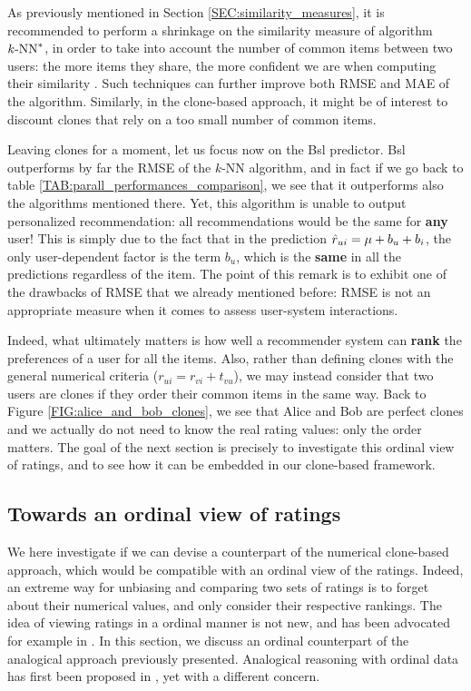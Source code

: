 As previously mentioned in Section \ref{SEC:similarity_measures}, it is recommended to perform a
shrinkage on the similarity measure of algorithm $k\text{-NN}^*$, in order to take into
account the number of common items between two users: the more items they
share, the more confident we are when computing their similarity
\cite{KorACM2010}. Such techniques can further improve both RMSE and MAE of the
algorithm.  Similarly, in the clone-based approach, it might be of interest to
discount clones that rely on a too small number of common items.

Leaving clones for a moment, let us focus now on the Bsl predictor. Bsl outperforms by far the RMSE of the
$k$-NN algorithm, and in fact if we go back to table
\ref{TAB:parall_performances_comparison}, we see that it outperforms also the
algorithms mentioned there. Yet, this algorithm is unable to output
personalized recommendation: all recommendations would be the same for
\textbf{any} user! This is simply due to the fact that in the prediction
$\hat{r}_{ui} = \mu  + b_u + b_i$, the only user-dependent factor is the term
$b_u$, which is the \textbf{same} in all the predictions regardless of the
item. The point of this remark is to exhibit one of the drawbacks of RMSE that
we already mentioned before: RMSE is not an appropriate measure when it comes
to assess user-system interactions.

Indeed, what ultimately matters is how well a recommender system can
\textbf{rank} the preferences of a user for all the items. Also, rather than
defining clones with the general numerical criteria ($r_{ui} = r_{vi} +
t_{vu}$), we may instead consider that two users are clones if they order their
common items in the same way. Back to Figure \ref{FIG:alice_and_bob_clones}, we
see that Alice and Bob are perfect clones and we actually do not need to know
the real rating values: only the order matters. The goal of the next section is
precisely to investigate this ordinal view of ratings, and to see how it can be
embedded in our clone-based framework.

\subsection{Towards an ordinal view of ratings}

We here investigate if we can devise a counterpart of the numerical clone-based
approach, which would be compatible with an ordinal view of the ratings.
Indeed, an extreme way for unbiasing and comparing two sets of ratings is to
forget about their numerical values, and only consider their respective rankings. The
idea of viewing ratings in a ordinal manner is not new, and has been advocated
for example in \cite{KorSillRECSYS11}.  In this section, we discuss an ordinal
counterpart of the analogical approach previously presented.  Analogical
reasoning with ordinal data has first been proposed in \cite{MicBarCAP09}, yet
with a different concern.

